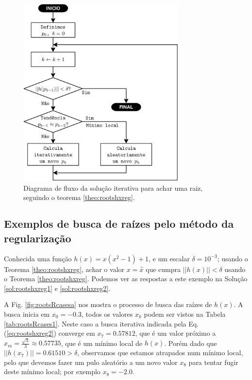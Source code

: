 \begin{figure}[!h]
     \centering
         \includegraphics[width=0.75\textwidth]{chapters/roots/fluxo3.eps}
        \caption{Diagrama de fluxo da solução iterativa para achar uma raiz, seguindo o teorema \ref{theo:rootshxreg}.}
        \label{fig:fluxorhxreg3}
\end{figure}

\subsection{Exemplos de busca de raízes pelo método da regularização}


\begin{example}\label{ex:rootshxreg1}
Conhecida uma função $h(x)=x(x^2-1)+1$, e um escalar $\delta=10^{-3}$; usando o Teorema \ref{theo:rootshxreg},
achar o valor $x=\hat{x}$ que cumpra $||h(x)||<\delta$ usando o Teorema \ref{theo:rootshxreg}.
Podemos ver as respostas a este exemplo na Solução \ref{sol:rootshxreg1} e \ref{sol:rootshxreg2}.
\end{example}
\begin{SolutionT}\label{sol:rootshxreg1}
 A Fig. \ref{fig:rootsRcasesa} nos mostra o processo de busca das raízes de $h(x)$. 
A busca inicia em $x_0=-0.3$, 
todos os valores $x_{k}$ podem ser vistos na
Tabela \ref{tab:rootsRcases1}. 
Neste caso a busca iterativa indicada pela Eq. (\ref{eq:rootshxreg2}) 
converge em $x_7=0.57812$, que é um valor próximo a $x_m=\frac{\sqrt{3}}{3}\approx 0.57735$,
que é um mínimo local de $h(x)$.
Porém dado que $||h(x_7)||=0.61510 >\delta$, observamos que estamos atrapados num mínimo local,
pelo que devemos fazer um pulo aleatório a um novo valor $x_8$
para tentar fugir deste mínimo local; por exemplo $x_8=-2.0$.
\end{SolutionT}

